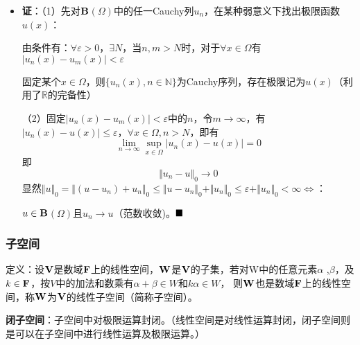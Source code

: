 \documentclass[12pt,a4paper]{article}
\begin{document}
\begin{itemize}
	\item[]
	\textbf{证}：（1）先对$\bf{B}$$(\Omega)$中的任一Cauchy列$u_n$，在某种弱意义下找出极限函数$u(x)$：
	
由条件有：$\forall \varepsilon>0$，$\exists N$，当$n,m>N$时，对于$\forall x\in \Omega$有$\vert u_n(x)-u_m(x)\vert<\varepsilon$

固定某个$x\in {\Omega}$，则$\{u_n(x),n\in \mathbb{N}\}$为Cauchy序列，存在极限记为$u(x)$（利用了$\mathbb{R}$的完备性）

（2）固定$\vert u_n(x)-u_m(x)\vert<\varepsilon$中的$n$，令$m\rightarrow \infty$，有$\vert u_n(x)-u(x)\vert\leq\varepsilon$，$\forall x\in \Omega,n>N$，即有
\begin{equation}
	\lim_{n\rightarrow\infty}\sup_{x\in \Omega}\vert u_n(x)-u(x)\vert=0
\end{equation}
即
\begin{equation}
	\Vert u_n-u\Vert_0\rightarrow 0
\end{equation}
显然$\Vert u\Vert_0=\Vert(u-u_n)+u_n\Vert_0\leq\Vert u-u_n\Vert_0+\Vert u_n\Vert_0\leq\varepsilon+\Vert u_n\Vert_0<\infty\Leftrightarrow$：

$u\in \bf{B}$$(\Omega)$且$u_n\rightarrow u$（范数收敛)。$\hfill\blacksquare$\end{itemize}

\subsubsection{子空间}
定义：设$\bf{V}$是数域$\bf{F}$上的线性空间，$\bf{W}$是$\bf{V}$的子集，若对W中的任意元素$\alpha$ ,$\beta$，及$k\in \bf{F}$，按$V$中的加法和数乘有$\alpha +\beta \in W$和$k\alpha \in W$，
则$\bf{W}$也是数域$\bf{F}$上的线性空间，称$\bf{W}$为$\bf{V}$的线性子空间（简称子空间）。	

\textbf{闭子空间}：子空间中对极限运算封闭。（线性空间是对线性运算封闭，闭子空间则是可以在子空间中进行线性运算及极限运算。）	
\end{document}
